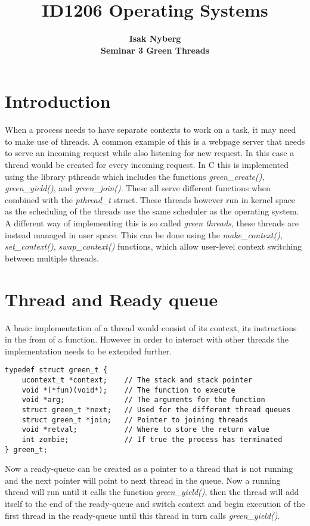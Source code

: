 \documentclass[a4paper,10pt]{article}
\title{\vspace{-1.5em}\textbf{ID1206 Operating Systems}}
\author{{\textbf{Isak Nyberg}} \\
        {\textbf{Seminar 3 Green Threads}}
        }
\begin{document}
\maketitle

\section*{Introduction}
When a process needs to have separate contexts to work on a task, it may need to make use of threads. A common example of this is a webpage server that needs to serve an incoming request while also listening for new request. In this case a thread would be created for every incoming request. In C this is implemented using the library pthreads which includes the functions \emph{green\_create()}, \emph{green\_yield()}, and \emph{green\_join()}. These all serve different functions when combined with the \emph{pthread\_t} struct. These threads however run in kernel space as the scheduling of the threads use the same scheduler as the operating system. A different way of implementing this is so called \emph{green threads}, these threads are instead managed in user space. This can be done using the \emph{make\_context()}, \emph{set\_context()}, \emph{swap\_context()} functions, which allow user-level context switching between multiple threads.

\section*{Thread and Ready queue}
A basic implementation of a thread would consist of its context, its instructions in the from of a function. However in order to interact with other threads the implementation needs to be extended further.

\begin{lstlisting}[title=Thread structure]
typedef struct green_t {
    ucontext_t *context;    // The stack and stack pointer
    void *(*fun)(void*);    // The function to execute
    void *arg;              // The arguments for the function
    struct green_t *next;   // Used for the different thread queues
    struct green_t *join;   // Pointer to joining threads
    void *retval;           // Where to store the return value
    int zombie;             // If true the process has terminated
} green_t;
\end{lstlisting}
Now a ready-queue can be created as a pointer to a thread that is not running and the next pointer will point to next thread in the queue. Now a running thread will run until it calls the function \emph{green\_yield()}, then the thread will add itself to the end of the ready-queue and switch context and begin execution of the first thread in the ready-queue until this thread in turn calls \emph{green\_yield()}.
\newpage
\end{document}
